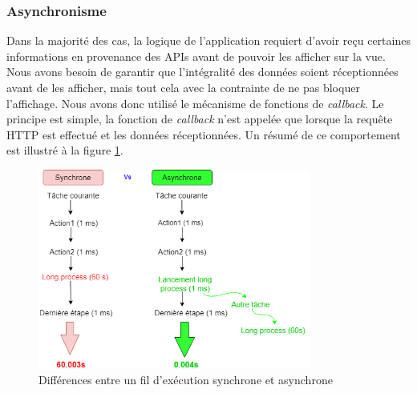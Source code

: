 \subsubsection{Asynchronisme}
Dans la majorité des cas, la logique de l'application requiert d'avoir reçu certaines informations en provenance des APIs avant de pouvoir les afficher sur la vue. Nous avons besoin de garantir que l'intégralité des données soient réceptionnées avant de les afficher, mais tout cela avec la contrainte de ne pas bloquer l'affichage.
Nous avons donc utilisé le mécanisme de fonctions de \textit{callback}. Le principe est simple, la fonction de \textit{callback} n'est appelée que lorsque la requête HTTP est effectué et les données réceptionnées. Un résumé de ce comportement est illustré à la figure \ref{asynchrone}.
\begin{figure}
    \begin{center}
        \includegraphics[width=0.8\textwidth]{img/schemas/Asynchronisme2.png}
    \end{center}
    \caption{Différences entre un fil d'exécution synchrone et asynchrone}
    \label{asynchrone}
\end{figure}

